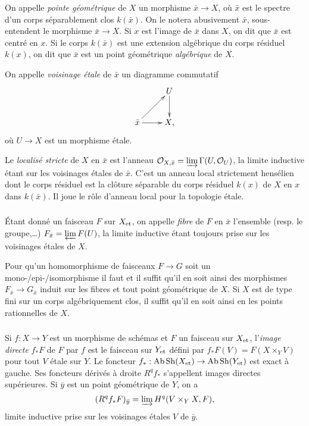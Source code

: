 \documentclass{article}
\DeclareMathOperator{\ab}{Ab}
\DeclareMathOperator{\sh}{Sh}
\newcommand{\et}[1]{{#1}_{\textnormal{et}}}
\newcommand{\cO}{\mathcal{O}}
\begin{document}
On appelle \emph{pointe géométrique} de $X$ un morphisme $\bar x\to X$, où 
$\bar x$ est le spectre d'un corps séparablement clos $k(\bar x)$. On le notera 
abusivement $\bar x$, sous-entendent le morphisme $\bar x\to X$. Si $x$ est 
l'image de $\bar x$ dans $X$, on dit que $\bar x$ est centré en $x$. Si le 
corps $k(\bar x)$ est une extension algébrique du corps résiduel $k(x)$, on dit 
que $\bar x$ est un point géométrique \emph{algébrique} de $X$. 

On appelle \emph{voisinage étale} de $\bar x$ un diagramme commutatif 
\[\xymatrix{
  & U \ar[d] \\
  \bar x \ar[ur] \ar[r] 
  & X\text{,}
}\]
où $U\to X$ est un morphisme étale. 

Le \emph{localisé stricte} de $X$ en $\bar x$ est l'anneau 
$\cO_{X,\bar x} = \varinjlim \Gamma(U,\cO_U)$, la limite inductive étant sur les 
voisinages étales de $\bar x$. C'est un anneau local strictement hensélien dont 
le corps résiduel est la clôture séparable du corps résiduel $k(x)$ de $X$ en 
$x$ dans $k(\bar x)$. Il joue le rôle d'anneau local pour la topologie étale. 





\subsubsection{}\label{2-3-2}

Étant donné un faisceau $F$ sur $\et X$, on appelle \emph{fibre} de $F$ en 
$\bar x$ l'ensemble (resp. le groupe,\dots) $F_{\bar x}=\varprojlim F(U)$, 
la limite inductive étant toujours prise sur les voisinages étales de  $X$. 

Pour qu'un homomorphisme de faisceaux $F\to G$ soit un mono-/epi-/isomorphisme 
il faut et il suffit qu'il en soit ainsi des morphismes 
$F_{\bar x}\to G_{\bar x}$ induit sur les fibres et tout point géométrique de 
$X$. Si $X$ est de type fini sur un corps algébriquement clos, il suffit qu'il 
en soit ainsi en les points rationnelles de $X$. 





\subsubsection{}\label{2-3-3}

Si $f:X\to Y$ est un morphisme de schémas et $F$ un faisceau sur $\et X$, 
l'\emph{image directe} $f_* F$ de $F$ par $f$ est le faisceau sur $\et Y$ 
défini par $f_* F(V) = F(X\times_Y V)$ pour tout $V$ étale sur $Y$. Le foncteur 
$f_*:\ab\sh(\et X)\to \ab\sh(\et Y)$ est exact à gauche. Ses foncteurs 
dérivés à droite $R^q f_*$ s'appellent images directes supérieures. Si 
$\bar y$ est un point géométrique de $Y$, on a 
\[
  (R^q f_* F)_{\bar y} = \varinjlim H^q(V\times_Y X,F)\text{,}
\]
limite inductive prise sur les voisinages étales $V$ de $\bar y$. 
\end{document}
